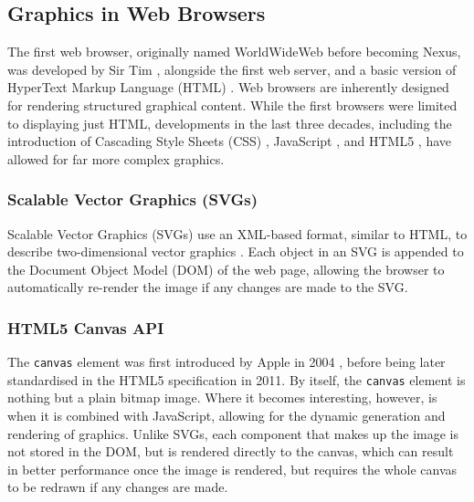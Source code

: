 \documentclass[../main.tex]{subfiles}
\begin{document}
        \subsection{Graphics in Web Browsers}
            The first web browser, originally named WorldWideWeb before becoming Nexus, was
                developed by Sir Tim \citet{worldWideWeb}, alongside the first web server, and
                a basic version of HyperText Markup Language (HTML) \citep{html}.
            Web browsers are inherently designed for rendering structured graphical
                content.
            While the first browsers were limited to displaying just HTML, developments in
                the last three decades, including the introduction of Cascading Style Sheets
                (CSS) \citep{css}, JavaScript \citep{js}, and HTML5 \citep{html5}, have allowed
                for far more complex graphics.

            \subsubsection{Scalable Vector Graphics (SVGs)}
                Scalable Vector Graphics (SVGs) use an XML-based format, similar to HTML, to
                    describe two-dimensional vector graphics \citep{svg}.
                Each object in an SVG is appended to the Document Object Model (DOM) of the web
                    page, allowing the browser to automatically re-render the image if any changes
                    are made to the SVG.

            \subsubsection{HTML5 Canvas API}
                The \texttt{canvas} element was first introduced by Apple in 2004
                    \citep{appleCanvas}, before being later standardised in the HTML5 specification
                    \citep{html5Canvas} in 2011.
                By itself, the \texttt{canvas} element is nothing but a plain bitmap image.
                Where it becomes interesting, however, is when it is combined with JavaScript,
                    allowing for the dynamic generation and rendering of graphics.
                Unlike SVGs, each component that makes up the image is not stored in the DOM,
                    but is rendered directly to the canvas, which can result in better performance
                    once the image is rendered, but requires the whole canvas to be redrawn if any
                    changes are made.
\end{document}
